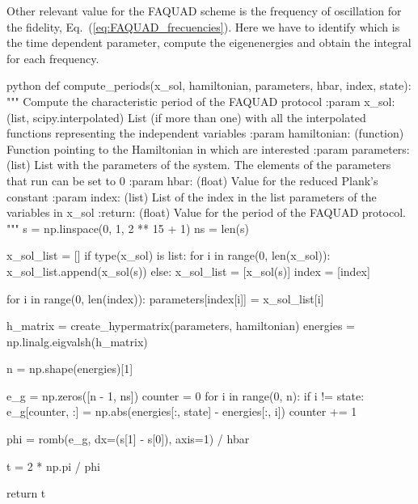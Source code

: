 Other relevant value for the FAQUAD scheme is the frequency of oscillation for the fidelity, Eq.~(\ref{eq:FAQUAD_frecuencies}). Here we have to identify which is the time dependent parameter, compute the eigenenergies and obtain the integral for each frequency.
\begin{mintedbox}{python}
def compute_periods(x_sol, hamiltonian, parameters, hbar, index, state):
	"""
	Compute the characteristic period of the FAQUAD protocol
	:param x_sol: (list, scipy.interpolated) List (if more than one) with all the interpolated functions representing the independent variables
	:param hamiltonian: (function) Function pointing to the Hamiltonian in which are interested
	:param parameters: (list) List with the parameters of the system. The elements of the parameters that run can be set to 0
	:param hbar: (float) Value for the reduced Plank's constant
	:param index: (list) List of the index in the list parameters of the variables in x_sol
	:return: (float) Value for the period of the FAQUAD protocol.
	"""
	s = np.linspace(0, 1, 2 ** 15 + 1)
	ns = len(s) 

	x_sol_list = [] 
	if type(x_sol) is list:
		for i in range(0, len(x_sol)):
		x_sol_list.append(x_sol(s))
	else:
		x_sol_list = [x_sol(s)]
		index = [index]

	for i in range(0, len(index)):
		parameters[index[i]] = x_sol_list[i]

	h_matrix = create_hypermatrix(parameters, hamiltonian)
	energies = np.linalg.eigvalsh(h_matrix)

	n = np.shape(energies)[1]

	e_g = np.zeros([n - 1, ns])
	counter = 0
	for i in range(0, n):
		if i != state:
			e_g[counter, :] = np.abs(energies[:, state] - energies[:, i])
			counter += 1

	phi = romb(e_g, dx=(s[1] - s[0]), axis=1) / hbar 

	t = 2 * np.pi / phi

	return t
\end{mintedbox}

